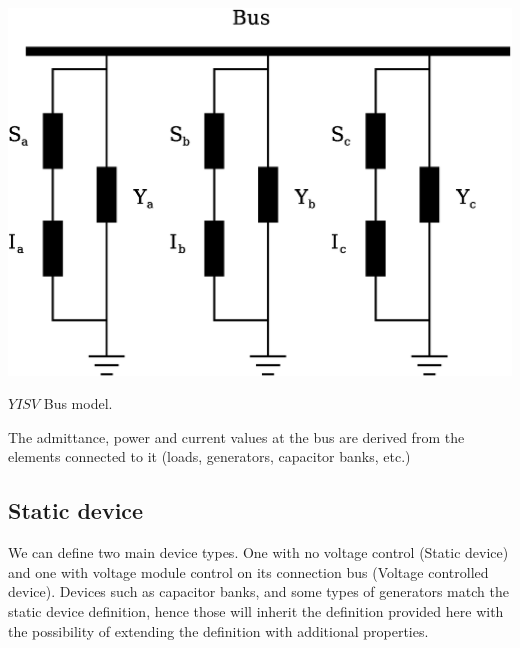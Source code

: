 \documentclass[nols,a4paper,twoside,notoc,fleqn]{tufte-book}
\begin{document}
\begin{marginfigure}
	\includegraphics[width=0.99\linewidth]{img/NodeElements.eps}
	\caption{$YISV$ Bus model.}
	\label{bus_model}
\end{marginfigure}

The admittance, power and current values at the bus are derived from the elements connected to it (loads, generators, capacitor banks, etc.)


\subsection{Static device}

We can define two main device types. One with no voltage control (Static device) and one with voltage module control on its connection bus (Voltage controlled device). Devices such as capacitor banks, and some types of generators match the static device definition, hence those will inherit the definition provided here with the possibility of extending the definition with additional properties.
\end{document}
